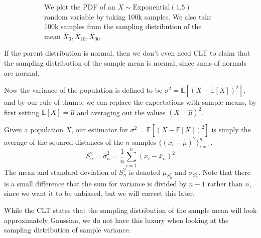 \begin{example}
\begin{figure}[H]
\begin{subfigure}[b]{0.48\textwidth}
        \caption{We plot the PDF of an $X \sim \mathrm{Exponential}(1.5)$ random variable by taking 100k samples. We also take 100k samples from the sampling distribution of the mean $\overline{X}_{3}, \overline{X}_{10}, \overline{X}_{30}$. }
        \label{fig:sample_mean_exp}
      \end{subfigure}
      \caption{}
      \label{fig:sample_mean_examples}
    \end{figure}
  \end{example}

  If the parent distribution is normal, then we don't even need CLT to claim that the sampling distribution of the sample mean is normal, since sums of normals are normal. 

  Now the variance of the population is defined to be $\sigma^2 = \mathbb{E}[ (X - \mathbb{E}[X])^2 ]$, and by our rule of thumb, we can replace the expectations with sample means, by first setting $\mathbb{E}[X] = \widehat{\mu}$ and averaging out the values $(X - \widehat{\mu})^2$. 

  \begin{definition}
    Given a population $X$, our estimator for $\sigma^2 = \mathbb{E}[ (X - \mathbb{E}[X])^2 ]$ is simply the average of the squared distances of the $n$ samples $\{(x_i - \widehat{\mu})^2\}_{i=1}^n$. 
    \begin{equation}
      S^2_n = \widehat{\sigma}^2_n = \frac{1}{n} \sum_{i=1}^n ( x_i - \overline{x}_n)^2
    \end{equation}
    The mean and standard deviation of $S^2_n$ is denoted $\mu_{S^2_n}$ and $\sigma_{S^2_n}$. Note that there is a small difference that the sum for variance is divided by $n-1$ rather than $n$, since we want it to be unbiased, but we will correct this later. 
  \end{definition}

  While the CLT states that the sampling distribution of the sample mean will look approximately Gaussian, we do not have this luxury when looking at the sampling distribution of sample variance. 

